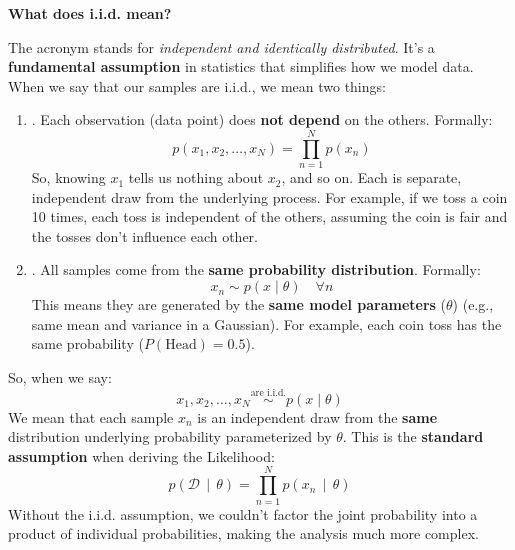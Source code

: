 \highspace
\begin{flushleft}
    \textcolor{Green3}{ \textbf{What does i.i.d. mean?}}\label{def:iid}
\end{flushleft}
The acronym  stands for \emph{independent and identically distributed}. It's a \textbf{fundamental assumption} in statistics that simplifies how we model data. When we say that our samples are i.i.d., we mean two things:
\begin{enumerate}
    \item {}. Each observation (data point) does \textbf{not depend} on the others. Formally:
    \begin{equation*}
        p\left(x_{1}, x_{2}, \dots, x_{N}\right) = \displaystyle\prod_{n=1}^{N} p\left(x_{n}\right)
    \end{equation*}
    So, knowing $x_{1}$ tells us nothing about $x_{2}$, and so on. Each is separate, independent draw from the underlying process. For example, if we toss a coin 10 times, each toss is independent of the others, assuming the coin is fair and the tosses don't influence each other.

    \item {}. All samples come from the \textbf{same probability distribution}. Formally:
    \begin{equation*}
        x_{n} \sim p\left(x \mid \theta\right) \quad \forall n
    \end{equation*}
    This means they are generated by the \textbf{same model parameters} ($\theta$) (e.g., same mean and variance in a Gaussian). For example, each coin toss has the same probability ($P(\text{Head}) = 0.5$).
\end{enumerate}
So, when we say:
\begin{equation*}
    x_{1}, x_{2}, \ldots, x_{N} \overset{\text{are i.i.d.}}{\sim} p\left(x \mid \theta\right)
\end{equation*}
We mean that each sample $x_{n}$ is an independent draw from the \textbf{same} distribution underlying probability parameterized by $\theta$. This is the \textbf{standard assumption} when deriving the Likelihood:
\begin{equation*}
    p\left(\mathcal{D} \, \mid \, \theta\right) = \displaystyle\prod_{n=1}^{N} p\left(x_{n} \, \mid \, \theta\right)
\end{equation*}
Without the i.i.d. assumption, we couldn't factor the joint probability into a product of individual probabilities, making the analysis much more complex.

